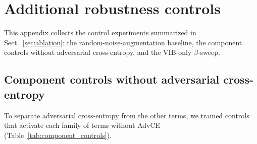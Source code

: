 \documentclass{aa}
\begin{document}
\FloatBarrier

\section{Additional robustness controls}
\label{app:controls}

This appendix collects the control experiments summarized in
Sect.~\ref{sec:ablation}: the random-noise-augmentation baseline, the
component controls without adversarial cross-entropy, and the VIB-only
$\beta$-sweep.



\subsection{Component controls without adversarial cross-entropy}
\label{app:component_controls}

To separate adversarial cross-entropy from the other terms, we trained
controls that activate each family of terms without AdvCE
(Table~\ref{tab:component_controls}).

\begin{table}[htbp]
\centering
\caption{Component controls on OGLE-III under the transferred CNN-targeted
attack ($k=0.5$). These runs use the same raw two-tower architecture and
training split as Table~\ref{tab:ablation_robust}, but isolate whether a
loss family can produce robustness without adversarial cross-entropy. Drop
is $\mathrm{acc}_{\mathrm{c}}-\mathrm{acc}_{\mathrm{a}}$ in percentage
points, so smaller is better.}
\label{tab:component_controls}
\small
\setlength{\tabcolsep}{3pt}
\end{table}
\end{document}

